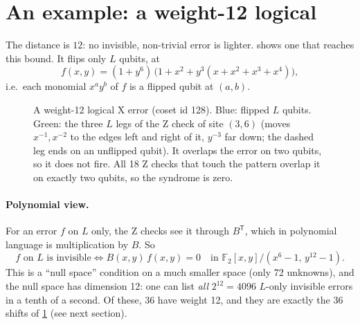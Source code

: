 \documentclass[11pt]{article}
\newcommand{\F}{\mathbb{F}_2}
\newcommand{\Lpos}[2]{({#1}, {#2})}
\newcommand{\Zpos}[2]{({#1-1.5}, {#2})}
\newcommand{\LposT}[2]{({#1}, {#2})}
\newcommand{\RposT}[2]{({mod(#1+4,6)+0.5}, {mod(#2+1,12)+0.5})}
\newcommand{\torus}{%
  \foreach \xx in {0,...,5} \draw[lat] (\xx,-0.25) -- (\xx,11.75);
  \foreach \yy in {0,...,11} \draw[lat] (-0.25,\yy+0.5) -- (5.75,\yy+0.5);
  \foreach \a in {0,...,5}{\foreach \b in {0,...,11}{%
    \node[dot] at \LposT{\a}{\b} {}; \node[dot] at \RposT{\a}{\b} {};}}
  \draw[faint] (-0.25,-0.25) rectangle (5.75,11.75);}
\begin{document}
\section{An example: a weight-12 logical}

The distance is $12$: no invisible, non-trivial error is lighter.  shows
one that reaches this bound. It flips only $L$ qubits, at
\[
  f(x,y) = (1+y^6)\,\bigl(1 + x^2 + y^3(x+x^2+x^3+x^4)\bigr),
\]
i.e.\ each monomial $x^ay^b$ of $f$ is a flipped qubit at $(a,b)$.

\begin{figure}[h]
\centering
{}
\caption{A weight-12 logical X error (coset id 128). Blue: flipped $L$ qubits. Green: the three $L$
legs of the Z check of site $(3,6)$ (moves $x^{-1}, x^{-2}$ to the edges left and right of it,
$y^{-3}$ far down; the dashed leg ends on an unflipped qubit).
It overlaps the error on two qubits, so it does not fire. All 18 Z checks that touch the
pattern overlap it on exactly two qubits, so the syndrome is zero.}
\label{fig:logical}
\end{figure}

\paragraph{Polynomial view.} For an error $f$ on $L$ only, the Z checks see it through
$B^{\mathsf T}$, which in polynomial language is multiplication by $B$. So
\[
  \text{$f$ on $L$ is invisible} \iff B(x,y)\, f(x,y) = 0 \quad\text{in } \F[x,y]/(x^6-1,\,y^{12}-1).
\]
This is a ``null space'' condition on a much smaller space (only 72 unknowns), and the
null space has dimension 12: one can list \emph{all} $2^{12}=4096$ $L$-only invisible errors
in a tenth of a second. Of these, 36 have weight 12, and they are exactly the 36 shifts of
\cref{fig:logical} (see next section).
\end{document}
